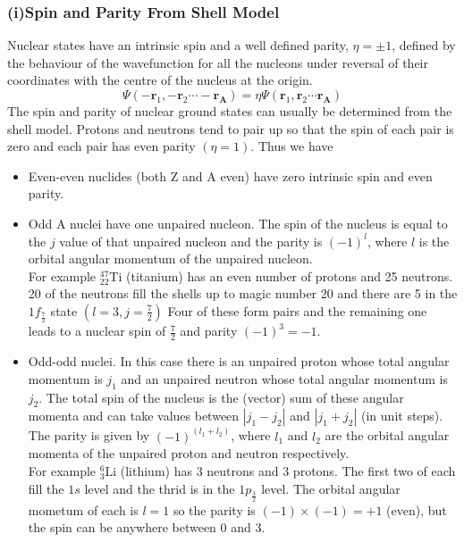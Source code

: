 \subsubsection{(i)Spin and Parity From Shell Model}
Nuclear states have an intrinsic spin and a well defined parity, $\eta=\pm 1$, defined by the behaviour of the wavefunction for all the nucleons under reversal of their coordinates with the centre of the nucleus at the origin.
$$
\Psi\left(-\mathbf{r}_{1},-\mathbf{r}_{2} \cdots-\mathbf{r}_{\mathbf{A}}\right)=\eta \Psi\left(\mathbf{r}_{1}, \mathbf{r}_{2} \cdots \mathbf{r}_{\mathbf{A}}\right)
$$
The spin and parity of nuclear ground states can usually be determined from the shell model. Protons and neutrons tend to pair up so that the spin of each pair is zero and each pair has even parity $(\eta=1)$. Thus we have
\begin{itemize}
	\item Even-even nuclides (both $\mathrm{Z}$ and $\mathrm{A}$ even) have zero intrinsic spin and even parity.
	\item Odd A nuclei have one unpaired nucleon. The spin of the nucleus is equal to the $j$ value of that unpaired nucleon and the parity is $(-1)^{l}$, where $l$ is the orbital angular momentum of the unpaired nucleon.\\
	For example ${ }_{22}^{47} \mathrm{Ti}$ (titanium) has an even number of protons and 25 neutrons. 20 of the neutrons fill the shells up to magic number 20 and there are 5 in the $1 f_{\frac{7}{2}}$ state $\left(l=3, j=\frac{7}{2}\right)$ Four of these form pairs and the remaining one leads to a nuclear spin of $\frac{7}{2}$ and parity $(-1)^{3}=-1$.
	\item Odd-odd nuclei. In this case there is an unpaired proton whose total angular momentum is $j_{1}$ and an unpaired neutron whose total angular momentum is $j_{2}$. The total spin of the nucleus is the (vector) sum of these angular momenta and can take values between $\left|j_{1}-j_{2}\right|$ and $\left|j_{1}+j_{2}\right|$ (in unit steps). The parity is given by $(-1)^{\left(l_{1}+l_{2}\right)}$, where $l_{1}$ and $l_{2}$ are the orbital angular momenta of the unpaired proton and neutron respectively.\\
	For example ${ }_{3}^{6} \mathrm{Li}$ (lithium) has 3 neutrons and 3 protons. The first two of each fill the $1 s$ level and the thrid is in the $1 p_{\frac{3}{2}}$ level. The orbital angular mometum of each is $l=1$ so the parity is $(-1) \times(-1)=+1$ (even), but the spin can be anywhere between 0 and $3 .$
\end{itemize}
